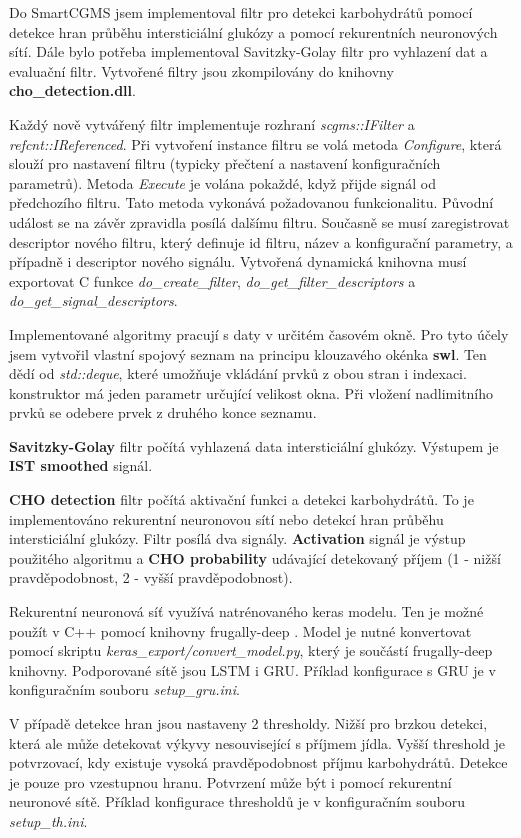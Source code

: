 Do SmartCGMS jsem implementoval filtr pro detekci karbohydrátů pomocí detekce hran průběhu intersticiální glukózy a pomocí rekurentních neuronových sítí. Dále bylo potřeba implementoval Savitzky-Golay filtr pro vyhlazení dat a evaluační filtr. Vytvořené filtry jsou zkompilovány do knihovny \textbf{cho\_detection.dll}.

Každý nově vytvářený filtr implementuje rozhraní \textit{scgms::IFilter} a \textit{refcnt::IReferenced}. Při vytvoření instance filtru se volá metoda \textit{Configure}, která slouží pro nastavení filtru (typicky přečtení a nastavení konfiguračních parametrů). Metoda \textit{Execute} je volána pokaždé, když přijde signál od předchozího filtru. Tato metoda vykonává požadovanou funkcionalitu. Původní událost se na závěr zpravidla posílá dalšímu filtru. Současně se musí zaregistrovat descriptor nového filtru, který definuje id filtru, název a konfigurační parametry, a případně i descriptor nového signálu. Vytvořená dynamická knihovna musí exportovat C funkce \textit{do\_create\_filter}, \textit{do\_get\_filter\_descriptors} a \textit{do\_get\_signal\_descriptors}.

Implementované algoritmy pracují s daty v určitém časovém okně. Pro tyto účely jsem vytvořil vlastní spojový seznam na principu klouzavého okénka \textbf{swl}. Ten dědí od \textit{std::deque}, které umožňuje vkládání prvků z obou stran i indexaci. konstruktor má jeden parametr určující velikost okna. Při vložení nadlimitního prvků se odebere prvek z druhého konce seznamu.

\textbf{Savitzky-Golay} filtr počítá vyhlazená data intersticiální glukózy. Výstupem je \textbf{IST smoothed} signál.

\textbf{CHO detection} filtr počítá aktivační funkci a detekci karbohydrátů. To je implementováno rekurentní neuronovou sítí nebo detekcí hran průběhu intersticiální glukózy. Filtr posílá dva signály. \textbf{Activation} signál je výstup použitého algoritmu a \textbf{CHO probability} udávající detekovaný příjem (1 - nižší pravděpodobnost, 2 - vyšší pravděpodobnost).

Rekurentní neuronová síť využívá natrénovaného keras modelu. Ten je možné použít v C++ pomocí knihovny frugally-deep \citep{cho.frugally}. Model je nutné konvertovat pomocí skriptu \textit{keras\_export/convert\_model.py}, který je součástí frugally-deep knihovny. Podporované sítě jsou LSTM i GRU. Příklad konfigurace s GRU je v konfiguračním souboru \textit{setup\_gru.ini}.
 
V případě detekce hran jsou nastaveny 2 thresholdy. Nižší pro brzkou detekci, která ale může detekovat výkyvy nesouvisející s příjmem jídla. Vyšší threshold je potvrzovací, kdy existuje vysoká pravděpodobnost příjmu karbohydrátů. Detekce je pouze pro vzestupnou hranu. Potvrzení může být i pomocí rekurentní neuronové sítě. Příklad konfigurace thresholdů je v konfiguračním souboru \textit{setup\_th.ini}.

